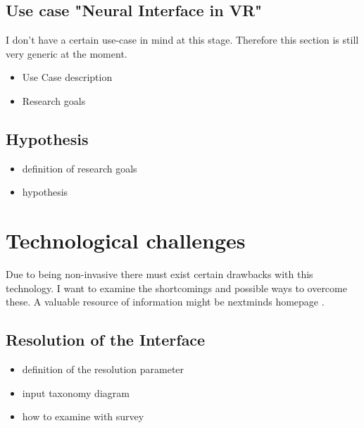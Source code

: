 \documentclass[titlepage, a4paper, 11pt]{scrartcl}
\begin{document}
        \subsection{Use case "Neural Interface in VR"}

            I don't have a certain use-case in mind at this stage. Therefore this section is still very generic at the moment.

            \begin{itemize}
                \item Use Case description
                \item Research goals
            \end{itemize}        

        \subsection{Hypothesis}

            \begin{itemize}
                \item definition of research goals
                \item hypothesis
            \end{itemize}
        
    \section{Technological challenges}

        Due to being non-invasive there must exist certain drawbacks with this technology. I want to examine the shortcomings and possible ways to overcome these.    
        A valuable resource of information might be nextminds homepage \cite{NextMind}.

        \subsection{Resolution of the Interface}

            \begin{itemize}
                \item definition of the resolution parameter
                \item input taxonomy diagram
                \item how to examine with survey                                     
            \end{itemize}
\end{document}
